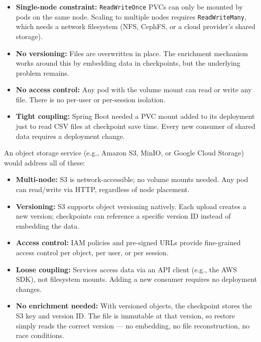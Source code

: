 \documentclass[11pt,a4paper]{article}
\begin{document}
\begin{itemize}[nosep]
  \item \textbf{Single-node constraint:} \texttt{ReadWriteOnce} PVCs can only
        be mounted by pods on the same node. Scaling to multiple nodes requires
        \texttt{ReadWriteMany}, which needs a network filesystem (NFS, CephFS,
        or a cloud provider's shared storage).
  \item \textbf{No versioning:} Files are overwritten in place. The enrichment
        mechanism works around this by embedding data in checkpoints, but the
        underlying problem remains.
  \item \textbf{No access control:} Any pod with the volume mount can read or
        write any file. There is no per-user or per-session isolation.
  \item \textbf{Tight coupling:} Spring Boot needed a PVC mount added to its
        deployment just to read CSV files at checkpoint save time. Every new
        consumer of shared data requires a deployment change.
\end{itemize}

An object storage service (e.g., Amazon S3, MinIO, or Google Cloud Storage)
would address all of these:

\begin{itemize}[nosep]
  \item \textbf{Multi-node:} S3 is network-accessible; no volume mounts needed.
        Any pod can read/write via HTTP, regardless of node placement.
  \item \textbf{Versioning:} S3 supports object versioning natively. Each upload
        creates a new version; checkpoints can reference a specific version ID
        instead of embedding the data.
  \item \textbf{Access control:} IAM policies and pre-signed URLs provide
        fine-grained access control per object, per user, or per session.
  \item \textbf{Loose coupling:} Services access data via an API client (e.g.,
        the AWS SDK), not filesystem mounts. Adding a new consumer requires no
        deployment changes.
  \item \textbf{No enrichment needed:} With versioned objects, the checkpoint
        stores the S3 key and version ID. The file is immutable at that version,
        so restore simply reads the correct version --- no embedding, no file
        reconstruction, no race conditions.
\end{itemize}
\end{document}

